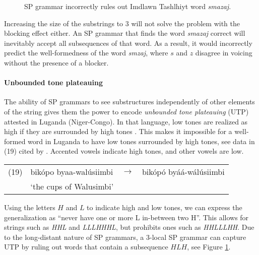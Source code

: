 \begin{figure}[h!]
\begin{center}
\end{center}
\caption{SP grammar incorrectly rules out Imdlawn Tashlhiyt word \emph{sm\textchi azaj}.}
\label{imdlawnbadsp}
\end{figure}

Increasing the size of the substrings to $3$ will not solve the problem with the blocking effect either.
An SP grammar that finds the word \emph{sm\textchi azaj} correct will inevitably accept all subsequences of that word.
As a result, it would incorrectly predict the well-formedness of the word \emph{smzaj}, where $s$ and $z$ disagree in voicing without the presence of a blocker.



\paragraph{Unbounded tone plateauing}
The ability of SP grammars to see substructures independently of other elements of the string gives them the power to encode \emph{unbounded tone plateauing} (UTP) attested in Luganda (Niger-Congo).
In that language, low tones are realized as high if they are surrounded by high tones \citep{HymanKatamba2010}.
This makes it impossible for a well-formed word in Luganda to have low tones surrounded by high tones, see data in (19) cited by \citep{Hyman2011,Jardine2016}.
Accented vowels indicate high tones, and other vowels are low.

\medskip
\begin{tabular}{llcl}
(19) & bik\'opo byaa-wal\'usiimbi & $\rightarrow$ & bik\'op\'o by\'a\'a-w\'al\'usiimbi \\
& `the cups of Walusimbi' &&
\end{tabular}
\medskip

Using the letters $H$ and $L$ to indicate high and low tones, we can express the generalization as ``never have one or more L in-between two H''.
This allows for strings such as \emph{HHL} and \emph{LLLHHHL}, but prohibits ones such as \emph{HHLLLHH}.
Due to the long-distant nature of SP grammars, a $3$-local SP grammar can capture UTP by ruling out words that contain a subsequence $HLH$, see Figure \ref{imdlawnbadsp}.

